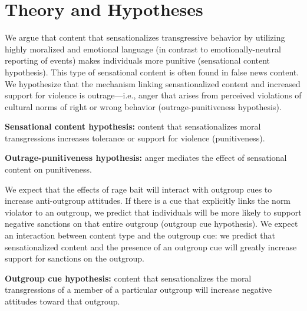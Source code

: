 \section{Theory and Hypotheses}

We argue that content that sensationalizes transgressive behavior by utilizing highly moralized and emotional language (in contrast to emotionally-neutral reporting of events) makes individuals more punitive (sensational content hypothesis). This type of sensational content is often found in false news content. We hypothesize that the mechanism linking sensationalized content and increased support for violence is outrage---i.e., anger that arises from perceived violations of cultural norms of right or wrong behavior \citep{crockett2017moral, stets2012current, turner2006sociological} (outrage-punitiveness hypothesis). 

\vspace{1em}
\noindent\textbf{Sensational content hypothesis:} content that sensationalizes moral transgressions increases tolerance or support for violence (punitiveness).

\vspace{1em}
\noindent\textbf{Outrage-punitiveness hypothesis:} anger mediates the effect of sensational content on punitiveness.

\vspace{1em}
We expect that the effects of rage bait will interact with outgroup cues to increase anti-outgroup attitudes. If there is a cue that explicitly links the norm violator to an outgroup, we predict that individuals will be more likely to support negative sanctions on that entire outgroup (outgroup cue hypothesis). We expect an interaction between content type and the outgroup cue: we predict that sensationalized content and the presence of an outgroup cue will greatly increase support for sanctions on the outgroup.

\vspace{1em}
\noindent\textbf{Outgroup cue hypothesis:}  content that sensationalizes the moral transgressions of a member of a particular outgroup will increase negative attitudes toward that outgroup.

